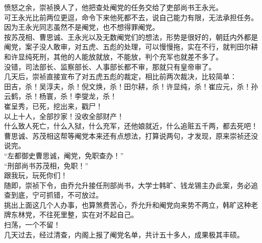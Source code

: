 \begin{multicols}{\theparacolNo}
愤怒之余，崇祯换人了，他把查处阉党的任务交给了吏部尚书王永光。\\

可王永光比前两位更逗，命令下来他死都不去，说自己能力有限，无法承担任务。\\

因为王永光同志虽然不是阉党，也不想得罪阉党。\\

按苏茂相、曹思诚、王永光以及无数阉党们的想法，形势是很好的，朝廷内外都是阉党，案子没人敢审，对五虎、五彪的处理，可以慢慢拖，实在不行，就判田尔耕和许显纯死刑，其他的人能放就放，不能放，判个充军也就差不多了。\\

没错，司法部长、监察部长、人事部长都不审，那就只有皇帝审了。\\

几天后，崇祯直接宣布了对五虎五彪的裁定，相比前两次裁决，比较简单：\\

田吉，杀！吴淳夫，杀！倪文焕，杀！田尔耕，杀！许显纯，杀！崔应元，杀！孙云鹤，杀！杨寰，杀！李燮龙，杀！\\

崔呈秀，已死，挖出来，戳尸！\\

以上十人，全部抄家！没收全部财产！\\

什么致人死亡，什么入狱，什么充军，还他娘就近，什么追赃五千两，都去死吧！\\

曹思诚、苏茂相这帮等阉党本来还有点想法，打算说两句，才发现，原来崇祯还没说完。\\

“左都御史曹思诚，阉党，免职查办！”\\

“刑部尚书苏茂相，免职！”\\

跟我玩，玩死你们！\\

随即，崇祯下令，由乔允升接任刑部尚书，大学士韩旷、钱龙锡主办此案，务必追查到底，宁可抓错，不可放过。\\

挑出上面这几个人办事，也算煞费苦心，乔允升和阉党向来势不两立，韩旷这种老牌东林党，不往死里整，实在对不起自己。\\

扫荡，一个不留！\\

几天过去，经过清查，内阁上报了阉党名单，共计五十多人，成果极其丰硕。\\


\end{multicols}
